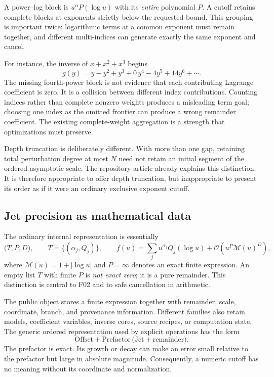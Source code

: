 \documentclass[11pt,a4paper]{article}
\newcommand{\code}[1]{\texttt{\detokenize{#1}}}
\newcommand{\OO}{\mathcal O}
\newcommand{\M}{\mathcal M}
\theoremstyle{definition}
\begin{document}
A power--log block is $u^\alpha P(\log u)$ with its \emph{entire} polynomial $P$. A cutoff retains complete blocks at exponents strictly below the requested bound. This grouping is important twice: logarithmic terms at a common exponent must remain together, and different multi-indices can generate exactly the same exponent and cancel.\cite{core,remainders}

For instance, the inverse of $x+x^2+x^3$ begins
\begin{equation}
 g(y)=y-y^2+y^3+0\,y^4-4y^5+14y^6+\cdots.
 \label{eq:resonance}
\end{equation}
The missing fourth-power block is not evidence that each contributing Lagrange coefficient is zero. It is a collision between different index contributions. Counting indices rather than complete nonzero weights produces a misleading term goal; choosing one index as the omitted frontier can produce a wrong remainder coefficient. The existing complete-weight aggregation is a strength that optimizations must preserve.

Depth truncation is deliberately different. With more than one gap, retaining total perturbation degree at most $N$ need not retain an initial segment of the ordered asymptotic scale. The repository article already explains this distinction. It is therefore appropriate to offer depth truncation, but inappropriate to present its order as if it were an ordinary exclusive exponent cutoff.\cite{remainders}

\subsection{Jet precision as mathematical data}

The ordinary internal representation is essentially
\begin{equation}
 \bigl(T,P,D\bigr),\qquad
 T=\{(\alpha_j,Q_j)\},\qquad
 f(u)=\sum_j u^{\alpha_j}Q_j(\log u)
       +\OO\!\left(u^P\M(u)^D\right),
 \label{eq:jet}
\end{equation}
where $\M(u)=1+|\log u|$ and $P=\infty$ denotes an exact finite expression. An empty list $T$ with finite $P$ is \emph{not exact zero}; it is a pure remainder. This distinction is central to F02 and to safe cancellation in arithmetic.\cite{core,operations,envelopes}

The public \code{GeneralizedSeries} object stores a finite expression together with remainder, scale, coordinate, branch, and provenance information. Different families also retain models, coefficient variables, inverse cores, source recipes, or computation state. The generic ordered representation used by explicit operations has the form
\begin{equation}
 \mathrm{Offset}+\mathrm{Prefactor}\,\bigl(\mathrm{Jet}+\mathrm{remainder}\bigr).
 \label{eq:factored}
\end{equation}
The prefactor is exact. Its growth or decay can make an error small relative to the prefactor but large in absolute magnitude. Consequently, a numeric cutoff has no meaning without its coordinate and normalization.
\end{document}
